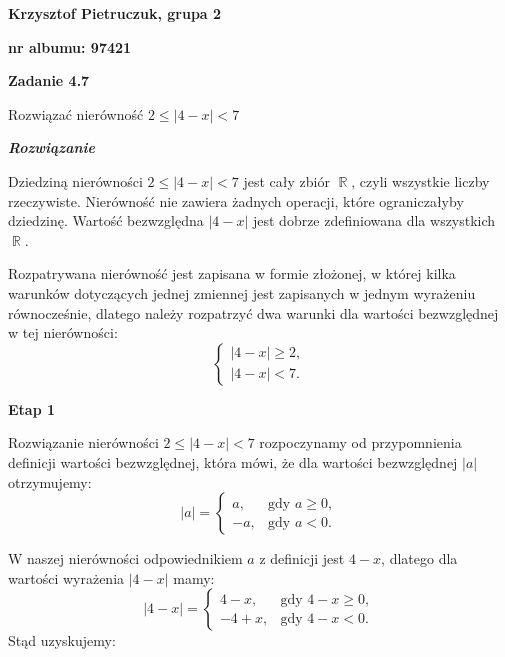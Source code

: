 \documentclass[12pt, a4paper]{report}
\DeclareMathOperator{\R}{\mathbb{R}}
\begin{document}
    \begin{center}
        \textbf{Krzysztof Pietruczuk, grupa 2}

        \textbf{nr albumu: 97421}
    \end{center}

    \medskip

    \noindent
    \textbf{Zadanie 4.7}

    \noindent
    Rozwiązać nierówność $2 \leq |4 - x| < 7$

    \bigskip
    \noindent
    \emph{\textbf{Rozwiązanie}}


    \noindent
    Dziedziną nierówności $2 \leq |4 - x| < 7$ jest cały zbiór $\R$, czyli wszystkie liczby rzeczywiste.
    Nierówność nie zawiera żadnych operacji, które ograniczałyby dziedzinę. Wartość bezwzględna $|4 - x|$
    jest dobrze zdefiniowana dla wszystkich $\R$.

    \medskip

    \noindent
    Rozpatrywana nierówność jest zapisana w formie złożonej, w której kilka warunków dotyczących jednej zmiennej
    jest zapisanych w jednym wyrażeniu równocześnie, dlatego należy rozpatrzyć dwa warunki dla wartości bezwzględnej w tej nierówności:
    \[
        \begin{cases}
            |4 - x| \geq 2, \\
            |4 - x| < 7.
        \end{cases}
    \]

    \vspace{10pt}                            %

    \noindent
    \textbf{Etap 1}

    \noindent
    Rozwiązanie nierówności $2 \leq |4 - x| < 7$ rozpoczynamy od przypomnienia definicji wartości bezwzględnej, która mówi,
    że dla wartości bezwzględnej $|a|$ otrzymujemy:
    \[
        |a| = \begin{cases}
                  a, & \text{gdy } a \geq 0, \\
                  -a, & \text{gdy } a < 0.
        \end{cases}
    \]

    \noindent
    W naszej nierówności odpowiednikiem $a$ z definicji jest $4-x$,
    dlatego dla wartości wyrażenia $|4-x|$ mamy:
    \[
        |4-x| = \begin{cases}
                  4-x, & \text{gdy } 4-x \geq 0, \\
                  -4+x, & \text{gdy } 4-x < 0.
        \end{cases}
    \]
    Stąd uzyskujemy:
\end{document}
